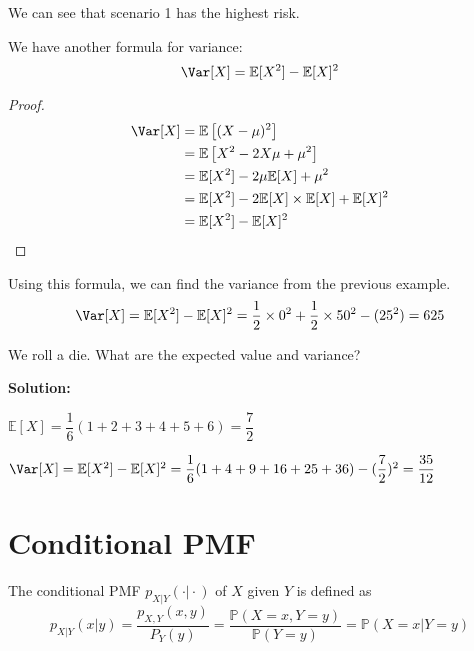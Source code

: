 We can see that scenario 1 has the highest risk. 

We have another formula for variance: 
\[
    \Var[X] = \mathbb{E}[X^2] - \mathbb{E}[X]^2
\]
\begin{proof}
    \[
        \begin{aligned}
            \Var[X] &= \mathbb{E}\left[(X - \mu)^2 \right] \\
            &= \mathbb{E}\left[X^2 -2 X \mu + \mu^2 \right] \\
            &= \mathbb{E}[X^2] -2\mu\mathbb{E}[X] + \mu^2 \\
            &= \mathbb{E}[X^2] - 2\mathbb{E}[X] \times \mathbb{E}[X] + \mathbb{E}[X]^2 \\
            &= \mathbb{E}[X^2] - \mathbb{E}[X]^2
        \end{aligned}
    \]
\end{proof}

Using this formula, we can find the variance from the previous example.
\[
\Var[X] = \mathbb{E}[X^2] - \mathbb{E}[X]^2 = \dfrac{1}{2} \times 0^2 + \dfrac{1}{2} \times 50^2 - (25^2) = 625
\] 

\begin{eg}
    We roll a die. What are the expected value and variance?

    \textbf{Solution:} 
    
    \(\mathbb{E}[X] = \dfrac{1}{6}(1 + 2 + 3 + 4 + 5 + 6) = \dfrac{7}{2}\)

    \(\Var[X] = \mathbb{E}[X^2] - \mathbb{E}[X]^2 = \dfrac{1}{6}(1 + 4 + 9 + 16 + 25 + 36) - (\dfrac{7}{2})^2 = \dfrac{35}{12}\)
\end{eg}

\newpage
\section{Conditional PMF}

\begin{definition}
The conditional PMF \(p_{X \vert Y} (\cdot\vert\cdot)\) of \(X\) given \(Y\) is defined as 
\[
    p_{X \vert Y} (x \vert y) = \dfrac{p_{X,Y}(x, y)}{P_Y (y)} = \dfrac{\mathbb{P}(X = x, Y = y)}{\mathbb{P}(Y = y)} = \mathbb{P}(X = x \vert Y = y)
\]
\end{definition}

